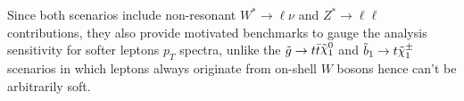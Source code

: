 Since both scenarios include non-resonant $W^*\to\ell\nu$ and $Z^*\to\ell\ell$ contributions, 
they also provide motivated benchmarks to gauge the analysis sensitivity for softer leptons $p_T$ spectra, 
unlike the $\gluino\to t\bar{t}\ninoone$ and $\sbot\to t\chargino$ scenarios 
in which leptons always originate from on-shell $W$ bosons hence can't be arbitrarily soft. 

